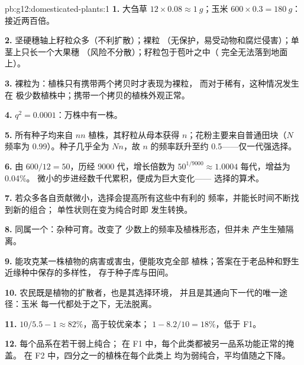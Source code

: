 \begin{solution}{pb:g12:domesticated-plants:1}
\textbf{1.} 大刍草 $12 \times 0.08 \approx \qty{1}{g}$；玉米 $600
\times 0.3 = \qty{180}{g}$：接近两百倍。

\textbf{2.} 坚硬穗轴上籽粒众多（不利扩散）；裸粒
（无保护，易受动物和腐烂侵害）；单茎上只长一个大果穗
（风险不分散）；籽粒包于苞叶之中（
完全无法落到地面上）。

\textbf{3.} 裸粒为：植株只有携带两个拷贝时才表现为裸粒，
而对于稀有，这种情况发生在
极少数植株中；携带一个拷贝的植株外观正常。

\textbf{4.} $q^2 = 0.0001$：万株中有一株。

\textbf{5.} 所有种子均来自 $nn$ 植株，其籽粒从母本获得
$n$；花粉主要来自普通田块（$N$
频率为 0.99）。种子几乎全为 $Nn$，故
$n$ 的频率跃升至约 0.5——仅一代强选择。

\textbf{6.} 由 $600/12 = 50$，历经 9000 代，增长倍数为 $50^{1/9000}
\approx 1.0004$ 每代，增益为 0.04\%。
微小的步进经数千代累积，便成为巨大变化——
选择的算术。

\textbf{7.} 若众多各自贡献微小，选择会提高所有这些中有利的
频率，并能长时间不断找到新的组合；
单性状则在变为纯合时即
发生转换。

\textbf{8.} 同属一个：杂种可育。改变了
少数上的频率及植株形态，但并未
产生生殖隔离。

\textbf{9.} 能攻克某一株植物的病害或害虫，便能攻克全部
植株；答案在于老品种和野生近缘种中保存的多样性，
存于种子库与田间。

\textbf{10.} 农民既是植物的扩散者，也是其选择环境，
并且是其通向下一代的唯一途径：玉米
每一代都处于之下，无法脱离。

\textbf{11.} $10/5.5 - 1 \approx 82\%$，高于较优亲本；
$1 - 8.2/10 = 18\%$，低于 F1。

\textbf{12.} 每个品系在若干弱上纯合；
在 F1 中，每个此类都被另一品系功能正常的掩盖。
在 F2 中，四分之一的植株在每个此类上
均为弱纯合，平均值随之下降。


\end{solution}
